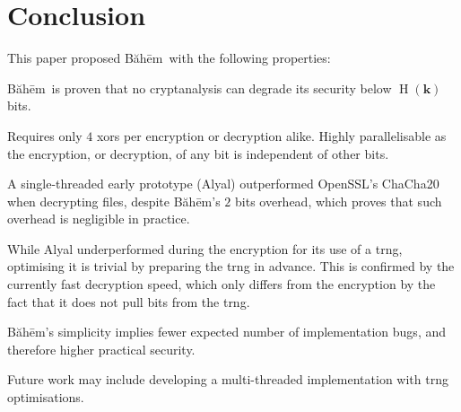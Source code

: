 \documentclass[twocolumn,hidelinks]{article}
\newcommand{\baheem}{Băhēm}
\DeclareMathOperator{\entropy}{H}
\begin{document}
\section{Conclusion}
This paper proposed \baheem\ with the following properties:
\begin{description}[itemsep=0em]
    \item[Secure.] \baheem\ is proven that no cryptanalysis can degrade its
        security below $\entropy(\mathbf{k})$ bits.
    \item[Fast.] Requires only $4$ \glspl{xor} per encryption or decryption
        alike.  Highly parallelisable as the encryption, or decryption, of
        any bit is independent of other bits.

        A single-threaded early prototype (Alyal) outperformed OpenSSL's
        ChaCha20 when decrypting files, despite \baheem's $2$ bits
        overhead, which proves that such overhead is negligible in
        practice.

        While Alyal underperformed during the encryption for its use of a
        \gls{trng}, optimising it is trivial by preparing the \gls{trng} in
        advance.  This is confirmed by the currently fast decryption speed,
        which only differs from the encryption by the fact that it does not
        pull bits from the \gls{trng}.
    \item[Simple.] \baheem's simplicity implies fewer expected number of
        implementation bugs, and therefore higher practical security.
\end{description}

Future work may include developing a multi-threaded implementation with
\gls{trng} optimisations.



\end{document}
